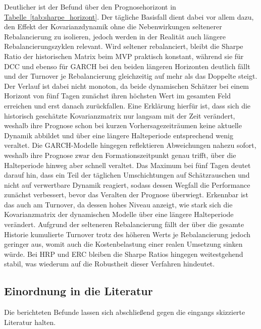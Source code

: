 \documentclass[a4paper, 12pt]{article}
\begin{document}
Deutlicher ist der Befund über den Prognosehorizont in \hyperref[tab:sharpe_horizont]{Tabelle~\ref*{tab:sharpe_horizont}}.
Der tägliche Basisfall dient dabei vor allem dazu, den Effekt der Kovarianzdynamik ohne die Nebenwirkungen seltenerer Rebalancierung zu isolieren, jedoch werden in der Realität auch längere Rebalancierungszyklen relevant.
Wird seltener rebalanciert, bleibt die Sharpe Ratio der historischen Matrix beim MVP praktisch konstant, während sie für DCC und ebenso für GARCH bei den beiden längeren Horizonten deutlich fällt und der Turnover je Rebalancierung gleichzeitig auf mehr als das Doppelte steigt.
Der Verlauf ist dabei nicht monoton, da beide dynamischen Schätzer bei einem Horizont von fünf Tagen zunächst ihren höchsten Wert im gesamten Feld erreichen und erst danach zurückfallen.
Eine Erklärung hierfür ist, dass sich die historisch geschätzte Kovarianzmatrix nur langsam mit der Zeit verändert, weshalb ihre Prognose schon bei kurzen Vorhersagezeiträumen keine aktuelle Dynamik abbildet und über eine längere Halteperiode entsprechend wenig veraltet.
Die GARCH-Modelle hingegen reflektieren Abweichungen nahezu sofort, weshalb ihre Prognose zwar den Formationszeitpunkt genau trifft, über die Halteperiode hinweg aber schnell veraltet.
Das Maximum bei fünf Tagen deutet darauf hin, dass ein Teil der täglichen Umschichtungen auf Schätzrauschen und nicht auf verwertbare Dynamik reagiert, sodass dessen Wegfall die Performance zunächst verbessert, bevor das Veralten der Prognose überwiegt.
Erkennbar ist das auch am Turnover, da dessen hohes Niveau anzeigt, wie stark sich die Kovarianzmatrix der dynamischen Modelle über eine längere Halteperiode verändert.
Aufgrund der selteneren Rebalancierung fällt der über die gesamte Historie kumulierte Turnover trotz des höheren Werts je Rebalancierung jedoch geringer aus, womit auch die Kostenbelastung einer realen Umsetzung sinken würde.
Bei HRP und ERC bleiben die Sharpe Ratios hingegen weitestgehend stabil, was wiederum auf die Robustheit dieser Verfahren hindeutet.



\subsection{Einordnung in die Literatur}\label{sec:literatur}
Die berichteten Befunde lassen sich abschließend gegen die eingangs skizzierte Literatur halten.
\end{document}
